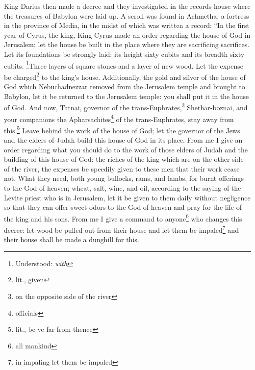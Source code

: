 
\begin{enumerate*}[mode=unboxed]
     King Darius then made a decree and they investigated in the records house where the treasures of Babylon were laid up.%
     A scroll was found in Achmetha, a fortress in the province of Media, in the midst of which was written a record:%
     ``In the first year of Cyrus, the king, King Cyrus made an order regarding the house of God in Jerusalem: let the house be built in the place where they are sacrificing sacrifices. Let its foundations be strongly laid: its height sixty cubits and its breadth sixty cubits.%
     \footnote{Understood: \textit{with}}Three layers of square stones and a layer of new wood. Let the expense be charged\footnote{lit., given} to the king's house.%
     Additionally, the gold and silver of the house of God which Nebuchadnezzar removed from the Jerusalem temple and brought to Babylon, let it be returned to the Jerusalem temple: you shall put it in the house of God.%
     And now, Tatnai, governor of the trans-Euphrates,\footnote{on the opposite side of the river} Shethar-boznai, and your companions the Apharsachites\footnote{officials} of the trans-Euphrates, stay away from this.\footnote{lit., be ye far from thence}%
     Leave behind the work of the house of God; let the governor of the Jews and the elders of Judah build this house of God in its place.%
     From me I give an order regarding what you should do to the work of those elders of Judah and the building of this house of God: the riches of the king which are on the other side of the river, the expenses be speedily given to these men that their work cease not.%
     What they need, both young bullocks, rams, and lambs, for burnt offerings to the God of heaven; wheat, salt, wine, and oil, according to the saying of the Levite priest who is in Jerusalem, let it be given to them daily without negligence%
     so that they can offer sweet odors to the God of heaven and pray for the life of the king and his sons.%
     From me I give a command to anyone\footnote{all mankind} who changes this decree: let wood be pulled out from their house and let them be impaled\footnote{in impaling let them be impaled} and their house shall be made a dunghill for this.%

\end{enumerate*}

